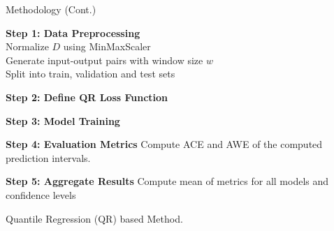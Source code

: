 \documentclass[xcolor=dvipsnames,aspectratio=169]{beamer}
\begin{document}
\begin{frame}{Methodology (Cont.)}
        \begin{algorithm}[H]
        \tiny
        \SetAlgoCaptionSeparator{:}

    
        \textbf{Step 1: Data Preprocessing}\\
        Normalize $D$ using MinMaxScaler\\
        Generate input-output pairs with window size $w$\\
        Split into train, validation and test sets
    
        \textbf{Step 2: Define QR Loss Function}\\
    
        \textbf{Step 3: Model Training}\\
    
        \textbf{Step 4: Evaluation Metrics}
        Compute ACE and AWE of the computed prediction intervals.
    
        \textbf{Step 5: Aggregate Results}
        Compute mean of metrics for all models and confidence levels
    
        \caption{Quantile Regression (QR) based Method.}
        \end{algorithm}
\end{frame}
\end{document}

